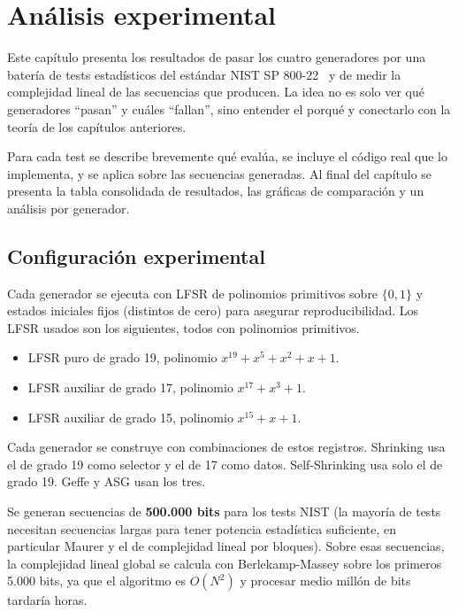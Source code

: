 \chapter{Análisis experimental}
\label{cap:analisis}

Este capítulo presenta los resultados de pasar los cuatro generadores por una batería de tests estadísticos del estándar NIST SP 800-22~\cite{nist2010}
y de medir la complejidad lineal de las secuencias que producen. La idea no es solo ver qué generadores ``pasan'' y cuáles ``fallan'',
sino entender el porqué y conectarlo con la teoría de los capítulos anteriores.

Para cada test se describe brevemente qué evalúa, se incluye el código real que lo implementa, y se aplica sobre las secuencias generadas.
Al final del capítulo se presenta la tabla consolidada de resultados, las gráficas de comparación y un análisis por generador.

\section{Configuración experimental}

Cada generador se ejecuta con LFSR de polinomios primitivos sobre $\{0, 1\}$ y estados iniciales fijos (distintos de cero) para asegurar reproducibilidad.
Los LFSR usados son los siguientes, todos con polinomios primitivos.

\begin{itemize}
  \item LFSR puro de grado 19, polinomio $x^{19} + x^{5} + x^2 + x + 1$.
  \item LFSR auxiliar de grado 17, polinomio $x^{17} + x^3 + 1$.
  \item LFSR auxiliar de grado 15, polinomio $x^{15} + x + 1$.
\end{itemize}

Cada generador se construye con combinaciones de estos registros. Shrinking usa el de grado 19 como selector y el de 17 como datos.
Self-Shrinking usa solo el de grado 19. Geffe y ASG usan los tres.

Se generan secuencias de \textbf{500.000 bits} para los tests NIST
(la mayoría de tests necesitan secuencias largas para tener potencia estadística suficiente, en particular Maurer y el de complejidad lineal por bloques).
Sobre esas secuencias, la complejidad lineal global se calcula con Berlekamp-Massey sobre los primeros 5.000 bits, ya que el algoritmo es $O(N^2)$
y procesar medio millón de bits tardaría horas.

